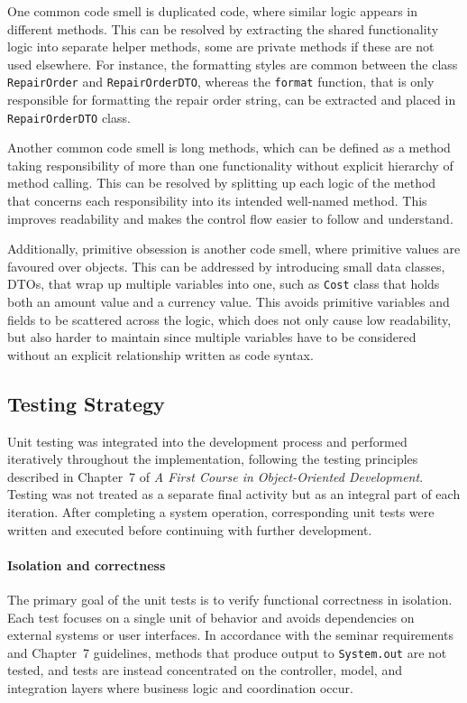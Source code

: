 \documentclass[a4paper]{scrartcl}
\begin{document}
One common code smell is duplicated code, where similar logic appears in different methods. This can be resolved by extracting the shared functionality logic into separate helper methods, some are private methods if these are not used elsewhere. For instance, the formatting styles are common between the class \texttt{RepairOrder} and \texttt{RepairOrderDTO}, whereas the \texttt{format} function, that is only responsible for formatting the repair order string, can be extracted and placed in \texttt{RepairOrderDTO} class.

Another common code smell is long methods, which can be defined as a method taking responsibility of more than one functionality without explicit hierarchy of method calling. This can be resolved by splitting up each logic of the method that concerns each responsibility into its intended well-named method. This improves readability and makes the control flow easier to follow and understand. 

Additionally, primitive obsession is another code smell, where primitive values are favoured over objects. This can be addressed by introducing small data classes, DTOs, that wrap up multiple variables into one, such as \texttt{Cost} class that holds both an amount value and a currency value. This avoids primitive variables and fields to be scattered across the logic, which does not only cause low readability, but also harder to maintain since multiple variables have to be considered without an explicit relationship written as code syntax.


\subsection{Testing Strategy}

Unit testing was integrated into the development process and performed iteratively throughout the implementation, following the testing principles described in Chapter~7 of \textit{A First Course in Object-Oriented Development}. Testing was not treated as a separate final activity but as an integral part of each iteration. After completing a system operation, corresponding unit tests were written and executed before continuing with further development.

\paragraph{Isolation and correctness} The primary goal of the unit tests is to verify functional correctness in isolation. Each test focuses on a single unit of behavior and avoids dependencies on external systems or user interfaces. In accordance with the seminar requirements and Chapter~7 guidelines, methods that produce output to \texttt{System.out} are not tested, and tests are instead concentrated on the controller, model, and integration layers where business logic and coordination occur.
\end{document}
